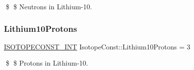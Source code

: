 \$ \$ Neutrons in Lithium-\/10. \mbox{\label{group___isotope_const-_lithium-_li10_ga7fc88650746e1f684ad9c68a7699e2ad}} 
\subsubsection{\texorpdfstring{Lithium10\+Protons}{Lithium10Protons}}
{\footnotesize\ttfamily \mbox{\hyperlink{group___isotope_const-_macros_ga5f18360b3e99483a35c32d789e62621c}{I\+S\+O\+T\+O\+P\+E\+C\+O\+N\+S\+T\+\_\+\+I\+NT}} Isotope\+Const\+::\+Lithium10\+Protons = 3}

\$ \$ Protons in Lithium-\/10. 